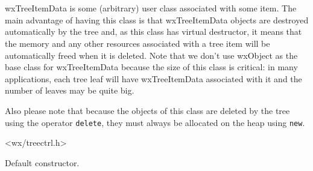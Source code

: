 \section{}\label{wxtreeitemdata}

wxTreeItemData is some (arbitrary) user class associated with some item. The
main advantage of having this class is that wxTreeItemData objects are
destroyed automatically by the tree and, as this class has virtual destructor,
it means that the memory and any other resources associated with a tree item
will be automatically freed when it is deleted. Note that we don't use wxObject
as the base class for wxTreeItemData because the size of this class is
critical: in many applications, each tree leaf will have wxTreeItemData
associated with it and the number of leaves may be quite big.

Also please note that because the objects of this class are deleted by the tree
using the operator {\tt delete}, they must always be allocated on the heap
using {\tt new}.




<wx/treectrl.h>






\label{wxtreeitemdatactor}


Default constructor.


